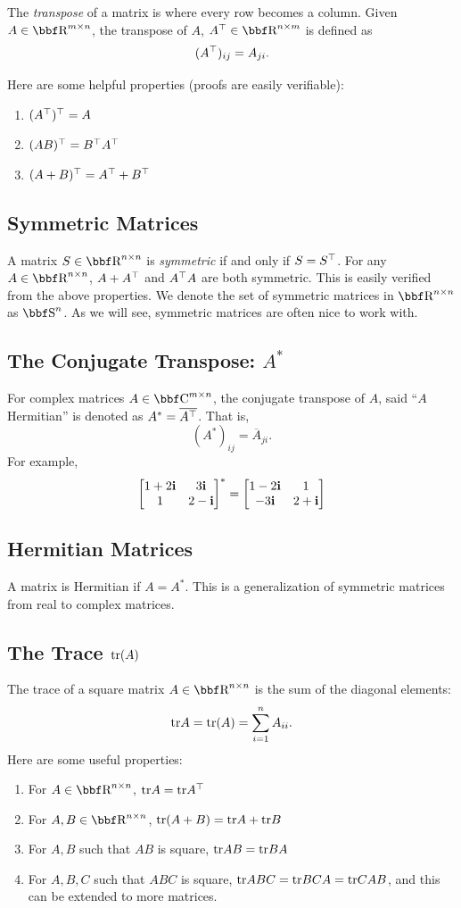 \documentclass{article}
\begin{document}
The \textit{transpose} of a matrix is where every row becomes a column. Given
$A\in\RR^{m\times n}$, the transpose of $A$, $A^\T\in\RR^{n\times m}$ is defined
as
\[
    (A^\top)_{ij} = A_{ji}.\\
\]

Here are some helpful properties (proofs are easily verifiable):
\begin{enumerate}[-]
\item $(A^\top)^\top = A$
\item $(AB)^\top = B^\top A^\top$
\item $(A+B)^\top = A^\top + B^\top$
\end{enumerate}

\subsection{Symmetric Matrices}

A matrix $S\in\RR^{n\times n}$ is \textit{symmetric} if and only if
$S = S^\top$. For any $A\in\RR^{n\times n}$, $A+A^\top$ and $A^\top A$
are both symmetric. This is easily verified from the above properties.
We denote the set of symmetric matrices in $\RR^{n\times n}$ as $\SS^n$.
As we will see, symmetric matrices are often nice to work with.

\subsection{The Conjugate Transpose: $A^*$}

For complex matrices $A\in\CC^{m\times n}$, the conjugate transpose of
$A$, said ``$A$ Hermitian'' is denoted as $A^* = \overline{A^\top}$.
That is,
\[
    (A^*)_{ij} = \overline{A}_{ji}.
\]
For example,
\[
    \begin{bmatrix} 1+2{\bf i} & 3{\bf i}\\ 1 & 2-{\bf i} \end{bmatrix}^* = \begin{bmatrix} 1-2{\bf i}&1\\-3{\bf i}&2+{\bf i} \end{bmatrix}
\]

\subsection{Hermitian Matrices}

A matrix is Hermitian if $A = A^*$. This is a generalization of symmetric
matrices from real to complex matrices.

\subsection{The Trace ${\hbox{tr}}(A)$}

The trace of a square matrix $A\in\RR^{n\times n}$ is the sum of the diagonal
elements:
\[
    {\hbox{tr}} A = {\hbox{tr}}(A) = \sum_{i=1}^n A_{ii}.
\]
Here are some useful properties:
\begin{enumerate}[-]
\item For $A\in\RR^{n\times n}$, ${\hbox{tr}} A = {\hbox{tr}} A^\top$
\item For $A,B\in\RR^{n\times n}$, ${\hbox{tr}}(A+B) = {\hbox{tr}} A + {\hbox{tr}} B$
\item For $A,B$ such that $AB$ is square, ${\hbox{tr}} AB = {\hbox{tr}} BA$
\item For $A,B,C$ such that $ABC$ is square, ${\hbox{tr}} ABC = {\hbox{tr}} BCA
    = {\hbox{tr}} CAB$, and this can be extended to more matrices.
\end{enumerate}
\end{document}

